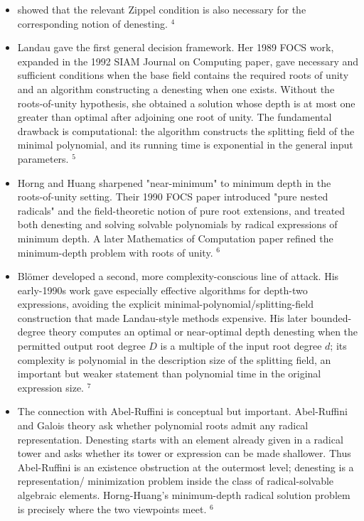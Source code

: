 \documentclass[10pt]{article}
\begin{document}
\begin{itemize}
  \item[] showed that the relevant Zippel condition is also necessary for the corresponding notion of denesting. ${ }^{4}$
  \item[4.] Landau gave the first general decision framework. Her 1989 FOCS work, expanded in the 1992 SIAM Journal on Computing paper, gave necessary and sufficient conditions when the base field contains the required roots of unity and an algorithm constructing a denesting when one exists. Without the roots-of-unity hypothesis, she obtained a solution whose depth is at most one greater than optimal after adjoining one root of unity. The fundamental drawback is computational: the algorithm constructs the splitting field of the minimal polynomial, and its running time is exponential in the general input parameters. ${ }^{5}$
  \item[5.] Horng and Huang sharpened "near-minimum" to minimum depth in the roots-of-unity setting. Their 1990 FOCS paper introduced "pure nested radicals" and the field-theoretic notion of pure root extensions, and treated both denesting and solving solvable polynomials by radical expressions of minimum depth. A later Mathematics of Computation paper refined the minimum-depth problem with roots of unity. ${ }^{6}$
  \item[6.] Blömer developed a second, more complexity-conscious line of attack. His early-1990s work gave especially effective algorithms for depth-two expressions, avoiding the explicit minimal-polynomial/splitting-field construction that made Landau-style methods expensive. His later bounded-degree theory computes an optimal or near-optimal depth denesting when the permitted output root degree $D$ is a multiple of the input root degree $d$; its complexity is polynomial in the description size of the splitting field, an important but weaker statement than polynomial time in the original expression size. ${ }^{7}$
  \item[7.] The connection with Abel-Ruffini is conceptual but important. Abel-Ruffini and Galois theory ask whether polynomial roots admit any radical representation. Denesting starts with an element already given in a radical tower and asks whether its tower or expression can be made shallower. Thus Abel-Ruffini is an existence obstruction at the outermost level; denesting is a representation/ minimization problem inside the class of radical-solvable algebraic elements. Horng-Huang's minimum-depth radical solution problem is precisely where the two viewpoints meet. ${ }^{6}$

\end{itemize}
\end{document}
